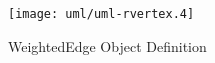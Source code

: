 \begin{figure}[htp]
  \begin{center}
    \texttt{[image: uml/uml-rvertex.4]}

    \caption{WeightedEdge Object Definition}
    \label{fig:weighted-edge-class}
  \end{center}
\end{figure}